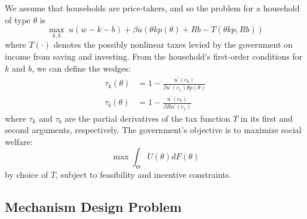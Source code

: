 \documentclass[11pt]{article}
\begin{document}
We assume that households are price-takers, and so the problem for a household of type \( \theta \) is 
\begin{equation}
    \max_{k,b}\ u\left(w-k-b\right)+\beta u\left(\theta kp\left(\theta\right)+Rb-T\left(\theta kp,Rb\right)\right)
\end{equation}
where \( T(\cdot) \) denotes the possibly nonlinear taxes levied by the government on income from saving and investing. From the household's first-order conditions for \( k \) and \( b \), we can define the wedges: 
\begin{align}
    \tau_k(\theta) &= 1-\frac{u^{\prime}\left(c_{0}\right)}{\beta u^{\prime}\left(c_{1}\right)\theta p\left(\theta\right)} \label{eq:static_tk} \\
    \tau_b(\theta) &= 1-\frac{u^{\prime}\left(c_{0}\right)}{\beta Ru^{\prime}\left(c_{1}\right)} \label{eq:static_tb} 
\end{align}
where \( \tau_k \) and \( \tau_b \) are the partial derivatives of the tax function \( T \) in its first and second arguments, respectively. The government's objective is to maximize social welfare:
\begin{equation}
    \max \int_{\Theta}U\left(\theta\right)dF\left(\theta\right) \label{eq:static_swf}
\end{equation}
by choice of \( T \), subject to feasibility and incentive constraints.

\subsection{Mechanism Design Problem} \label{subsec:mdprob}
\end{document}
